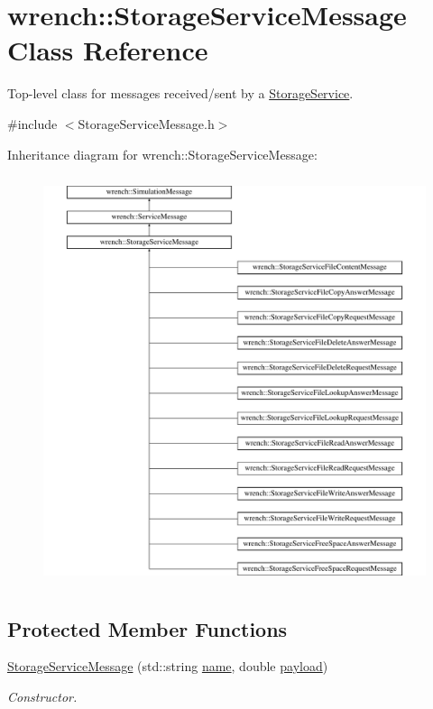 \hypertarget{classwrench_1_1_storage_service_message}{}\section{wrench\+:\+:Storage\+Service\+Message Class Reference}
\label{classwrench_1_1_storage_service_message}


Top-\/level class for messages received/sent by a \hyperlink{classwrench_1_1_storage_service}{Storage\+Service}.  




{\ttfamily \#include $<$Storage\+Service\+Message.\+h$>$}

Inheritance diagram for wrench\+:\+:Storage\+Service\+Message\+:\begin{figure}[H]
\begin{center}
\leavevmode
\includegraphics[height=12.000000cm]{classwrench_1_1_storage_service_message}
\end{center}
\end{figure}
\subsection*{Protected Member Functions}
\begin{DoxyCompactItemize}
\item 
\hyperlink{classwrench_1_1_storage_service_message_ae6ff83dfa5ca6b8355d1666944260f29}{Storage\+Service\+Message} (std\+::string \hyperlink{classwrench_1_1_simulation_message_ab224f6dd8ec5ee2e7f65bfcdf2b8a86b}{name}, double \hyperlink{classwrench_1_1_simulation_message_a914f2732713f7c02898e66f05a7cb8a1}{payload})
\begin{DoxyCompactList}\small\item\em Constructor. \end{DoxyCompactList}\end{DoxyCompactItemize}
